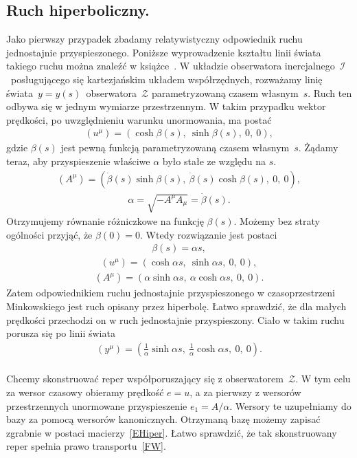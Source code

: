 \subsection{Ruch hiperboliczny.}
Jako pierwszy przypadek zbadamy relatywistyczny 
odpowiednik ruchu jednostajnie 
przyspieszonego.
Poniższe wyprowadzenie kształtu linii 
świata takiego ruchu można znaleźć 
w książce~\cite{trau1984}.
W układzie obserwatora inercjalnego~$\mathcal{I}$~posługującego się 
kartezjańskim układem współrzędnych, rozważamy linię 
świata~$y=y(s)$~obserwatora~$\mathcal{Z}$ parametryzowaną 
czasem własnym~$s$.
Ruch ten odbywa się w jednym wymiarze przestrzennym. 
W takim przypadku wektor prędkości, 
po uwzględnieniu warunku 
unormowania, ma postać
\begin{align}\label{UHiper}
(u^\mu) = (\cosh \beta( s ),\ \sinh \beta( s ),\ 0,\   0),
\end{align}
gdzie $\beta( s)$ jest pewną funkcją parametryzowaną czasem własnym~$s$.
Żądamy teraz, 
aby przyspieszenie właściwe $\alpha$ 
było stałe ze względu na $s$. 
\begin{align}\nonumber
(A^\mu) = ( \dot{\beta}( s ) \sinh \beta( s ),\ 
\dot{\beta}( s ) \cosh \beta( s ),\ 0,\ 0 ),
\end{align}
\begin{align}\nonumber
\alpha = \sqrt{ - A^\mu A_\mu } = \dot{\beta}( s ).
\end{align}
Otrzymujemy równanie różniczkowe na funkcję $\beta(s)$. 
Możemy bez straty ogólności przyjąć, że $\beta(0)  = 0$. 
Wtedy rozwiązanie jest postaci
\begin{align}\nonumber
\beta( s ) = \alpha s,
\end{align}
\begin{align}\nonumber
(u^\mu) = (\cosh \alpha s ,\ \sinh \alpha s ,\ 0,\   0),
\end{align}
\begin{align}\nonumber
(A^\mu) = ( \alpha \sinh \alpha s,\ \alpha \cosh \alpha s,\ 0,\ 0 ).
\end{align}
Zatem odpowiednikiem ruchu jednostajnie przyspieszonego w
czasoprzestrzeni Minkowskiego jest ruch opisany przez hiperbolę.
Łatwo sprawdzić, że dla małych prędkości przechodzi on
w ruch jednostajnie przyspieszony. Ciało w takim ruchu porusza
się po linii świata
\begin{align}\label{YHiper}
(y^\mu) = \left( \frac{1}{\alpha} \sinh \alpha s,\ 
\frac{1}{\alpha} \cosh \alpha s,\ 0,\ 0 \right).
\end{align}
\\
Chcemy skonstruować reper współporuszający się z 
obserwatorem~$\mathcal{Z}$. 
W tym celu za wersor czasowy obieramy prędkość $e = u$, 
a za pierwszy z wersorów przestrzennych unormowane 
przyspieszenie $e_1 = A/\alpha$.
Wersory te uzupełniamy do bazy za pomocą wersorów kanonicznych.
Otrzymaną bazę możemy zapisać zgrabnie w postaci 
macierzy~\eqref{EHiper}.
Łatwo sprawdzić, że tak skonstruowany reper spełnia
prawo transportu~\eqref{FW}.


